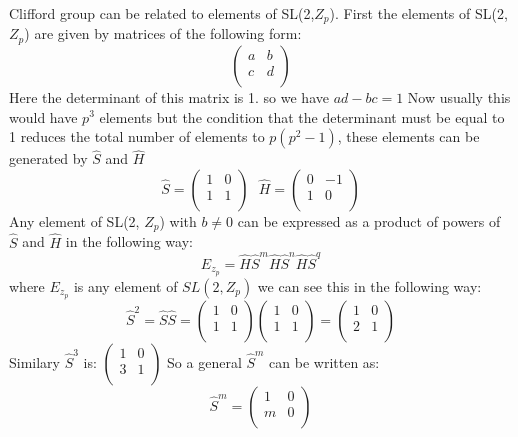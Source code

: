 \documentclass{article}
\begin{document}
Clifford group can be related to elements of SL(2,$Z_{p}$). First the elements of SL(2,$Z_{p}$) are given by matrices of the following form:
\begin{equation}
\begin{pmatrix}
a & b\\
c & d\\
\end{pmatrix}
\end{equation}
Here the determinant of this matrix is 1. so we have $ad-bc=1$
Now usually this would have $p^{3}$ elements but the condition that the determinant must be equal to 1 reduces the total number of elements to $p(p^2-1)$, these elements can be generated by $\hat{S}$ and $\hat{H}$
\[\hat{S}=
\begin{pmatrix}
1 & 0\\
1 & 1\\
\end{pmatrix}~~~
\hat{H}=
\begin{pmatrix}
0 & -1\\
1 & 0\\
\end{pmatrix}
\]
Any element of SL(2, $Z_{p}$) with $b\neq 0$ can be expressed as a product of powers of $\hat{S}$ and $\hat{H}$ in the following way:
\begin{equation*}
E_{z_{p}}=\hat{H}\hat{S}^{m}\hat{H}\hat{S}^{n}\hat{H}\hat{S}^{q}
\end{equation*}
where $E_{z_{p}}$ is any element of $SL(2, Z_{p})$
we can see this in the following way:
\[
\hat{S}^{2}=\hat{S}\hat{S}=
\begin{pmatrix}
1 & 0\\
1 & 1\\
\end{pmatrix}
\begin{pmatrix}
1 & 0\\
1 & 1\\
\end{pmatrix}
=
\begin{pmatrix}
1 & 0\\
2 & 1\\
\end{pmatrix}
\]
Similary $\hat{S}^{3}$ is: $
\begin{pmatrix}
1 & 0\\
3 & 1\\
\end{pmatrix}
$
So a general $\hat{S}^{m}$ can be written as:
\[
\hat{S}^{m}=
\begin{pmatrix}
1 & 0\\
m & 0\\
\end{pmatrix}
\]
\end{document}
